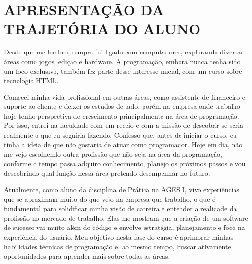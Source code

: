 \chapter[APRESENTAÇÃO DA TRAJETÓRIA DO ALUNO]{APRESENTAÇÃO DA TRAJETÓRIA DO ALUNO}

Desde que me lembro, sempre fui ligado com computadores, explorando diversas áreas como jogos, edição e hardware. A programação, embora nunca
tenha sido um foco exclusivo, também fez parte desse interesse inicial, com um curso sobre tecnologia HTML.

Comecei minha vida profissional em outras áreas, como assistente de financeiro e suporte ao cliente e deixei os estudos de lado, porém na empresa onde trabalho hoje tenho perspectiva de crescimento principalmente na área de programação. Por isso, entrei na faculdade com um receio e com a missão de descobrir se seria realmente o que eu seguiria fazendo. Confesso que, antes de iniciar o curso, eu tinha a ideia de que não gostaria de atuar como programador. Hoje em dia, não me vejo escolhendo outra profissão que não seja na área da programação, conforme o tempo passa adquiro conhecimento, planejo os próximos passos e vou descobrindo qual função nessa área pretendo desempenhar no futuro.

Atualmente, como aluno da disciplina de Prática na AGES I, vivo experiências que se aproximam muito do que vejo na empresa que trabalho, o que é fundamental para solidificar minha visão de carreira e entender a realidade da profissão no mercado de trabalho. Elas me mostram que a criação de um software de sucesso vai muito além do código e envolve estratégia, planejamento e foco na experiência do usuário. Meu objetivo nesta fase do curso é aprimorar minhas habilidades técnicas de programação e, ao mesmo tempo, buscar ativamente oportunidades para aprender mais sobre todas as áreas.  